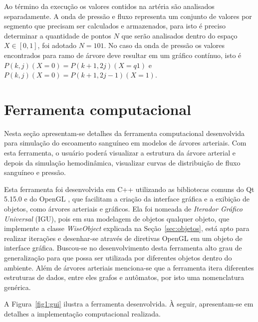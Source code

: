 \documentclass[
        english,			
        brazil			        %
        ,<...>]{abntbibufjf}
\begin{document}
Ao término da execução os valores contidos na artéria são analisados separadamente. A onda de pressão e fluxo representa um conjunto de valores por segmento que precisam ser calculados e armazenados, para isto é preciso determinar a quantidade de pontos $N$ que serão analisados dentro do espaço $X \in [0,1]$, foi adotado $N = 101$. No caso da onda de pressão os valores encontrados para ramo de árvore deve resultar em um gráfico contínuo, isto é $P(k,j)(X=0) = P(k+1,2j)(X=q1)$ e $P(k,j)(X=0) = P(k+1,2j-1)(X=1)$.
	
\chapter{Ferramenta computacional}\label{sec:modelagem}

Nesta seção apresentam-se detalhes da ferramenta computacional desenvolvida para simulação do escoamento sanguíneo em modelos de árvores arteriais. Com esta ferramenta, o usuário poderá  visualizar a estrutura da árvore arterial e depois da simulação hemodinâmica, visualizar curvas de distribuição de fluxo sanguíneo e pressão.

Esta ferramenta foi desenvolvida em C++ utilizando as bibliotecas comuns do Qt 5.15.0 \cite{QTClasses} e do OpenGL \cite{OpenGL}, que facilitam a criação da interface gráfica e a exibição de objetos, como árvores arteriais e gráficos. Ela foi nomeada de \textit{Iterador Gráfico Universal} (IGU), pois em sua modelagem de objetos qualquer objeto, que implemente a classe \textit{WiseObject} explicada na Seção~\ref{sec:objetos}, está apto para realizar iterações e desenhar-se através de diretivas OpenGL em um objeto de interface gráfica. Buscou-se no desenvolvimento desta ferramenta alto grau de generalização para que possa ser utilizada por diferentes objetos dentro do ambiente. Além de árvores arteriais menciona-se que a ferramenta itera diferentes estruturas de dados, entre eles grafos e autômatos, por isto uma nomenclatura genérica.

A Figura~\ref{fig1:gui} ilustra a ferramenta desenvolvida. À seguir, apresentam-se em detalhes a implementação computacional realizada.
\end{document}

